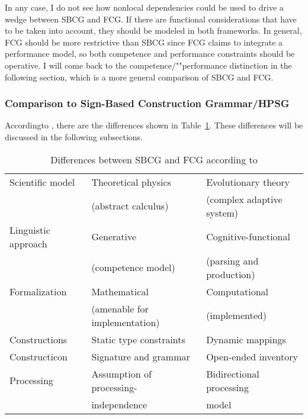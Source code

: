 In any case, I do not see how nonlocal dependencies could be used to drive a wedge between SBCG and
FCG. If there are functional considerations that have to be taken into account, they should be
modeled in both frameworks. In general, FCG should be more restrictive than SBCG since FCG claims to
integrate a performance model, so both competence and performance constraints should be operative. I
will come back to the competence/""performance distinction in the following section, which is a more
general comparison of SBCG and FCG.

\subsubsection{Comparison to Sign-Based Construction Grammar/HPSG}

\largerpage
According\indexhpsgstart\indexsbcgstart to \citet{vanTrijp2013a}, there are the differences shown in Table~\ref{table-differences-SBCG-FCG}.
%
These differences will be discussed in the following subsections.
\begin{table}
\caption{\label{table-differences-SBCG-FCG}Differences between SBCG and FCG according to \citet[]{vanTrijp2013a}}
\begin{tabular}{@{}lll@{}}\hline\hline
Scientific model    & Theoretical physics           & Evolutionary theory\\
                    & (abstract calculus)           &  (complex adaptive system)\\
Linguistic approach & Generative                    & Cognitive-functional\\
                    & (competence model)            & (parsing and production)\\
Formalization       & Mathematical                  & Computational\\ 
                    & (amenable for implementation) & (implemented)\\
Constructions       & Static type constraints       & Dynamic mappings\\
Constructicon       & Signature and grammar         & Open-ended inventory\\
Processing          & Assumption of processing-     & Bidirectional processing\\
                    & independence                  & model\\\hline\hline
\end{tabular}
\end{table}%

